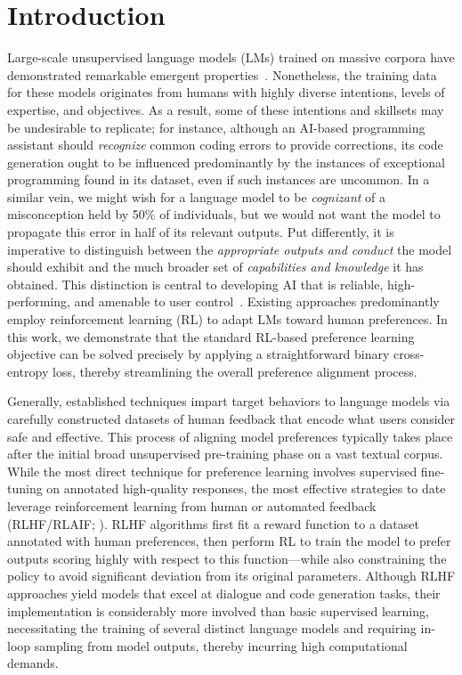 \section{Introduction}
Large-scale unsupervised language models (LMs) trained on massive corpora have demonstrated remarkable emergent properties~\citep{chowdhery2022palm, brown2020language, touvron2023llama, bubeck2023sparks}. Nonetheless, the training data for these models originates from humans with highly diverse intentions, levels of expertise, and objectives. As a result, some of these intentions and skillsets may be undesirable to replicate; for instance, although an AI-based programming assistant should \textit{recognize} common coding errors to provide corrections, its code generation ought to be influenced predominantly by the instances of exceptional programming found in its dataset, even if such instances are uncommon. In a similar vein, we might wish for a language model to be \textit{cognizant} of a misconception held by 50\% of individuals, but we would not want the model to propagate this error in half of its relevant outputs. Put differently, it is imperative to distinguish between the \emph{appropriate outputs and conduct} the model should exhibit and the much broader set of \textit{capabilities and knowledge} it has obtained. This distinction is central to developing AI that is reliable, high-performing, and amenable to user control~\citep{ouyang2022training}. Existing approaches predominantly employ reinforcement learning (RL) to adapt LMs toward human preferences. In this work, we demonstrate that the standard RL-based preference learning objective can be solved precisely by applying a straightforward binary cross-entropy loss, thereby streamlining the overall preference alignment process.

Generally, established techniques impart target behaviors to language models via carefully constructed datasets of human feedback that encode what users consider safe and effective. This process of aligning model preferences typically takes place after the initial broad unsupervised pre-training phase on a vast textual corpus. While the most direct technique for preference learning involves supervised fine-tuning on annotated high-quality responses, the most effective strategies to date leverage reinforcement learning from human or automated feedback (RLHF/RLAIF; \citep{christiano2017deep, bai2022constitutional}). RLHF algorithms first fit a reward function to a dataset annotated with human preferences, then perform RL to train the model to prefer outputs scoring highly with respect to this function—while also constraining the policy to avoid significant deviation from its original parameters. Although RLHF approaches yield models that excel at dialogue and code generation tasks, their implementation is considerably more involved than basic supervised learning, necessitating the training of several distinct language models and requiring in-loop sampling from model outputs, thereby incurring high computational demands.

